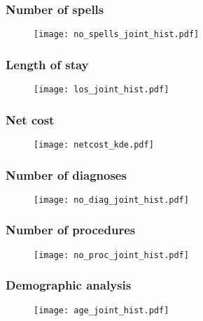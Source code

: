 \begin{frame}
    \frametitle{Number of spells}

    \begin{figure}
    \texttt{[image: no\_spells\_joint\_hist.pdf]}
    \end{figure}
\end{frame}

\begin{frame}
    \frametitle{Length of stay}

    \begin{figure}
        \texttt{[image: los\_joint\_hist.pdf]}
    \end{figure}
\end{frame}

\begin{frame}
    \frametitle{Net cost}

    \begin{figure}
    \texttt{[image: netcost\_kde.pdf]}
    \end{figure}
\end{frame}

\begin{frame}
    \frametitle{Number of diagnoses}
   
    \begin{figure}
    \texttt{[image: no\_diag\_joint\_hist.pdf]}
    \end{figure}
\end{frame}

\begin{frame}
    \frametitle{Number of procedures}

    \begin{figure}
    \texttt{[image: no\_proc\_joint\_hist.pdf]}
    \end{figure}
\end{frame}

\begin{frame}
    \frametitle{Demographic analysis}

    \begin{figure}
    \texttt{[image: age\_joint\_hist.pdf]}
    \end{figure}
\end{frame}
